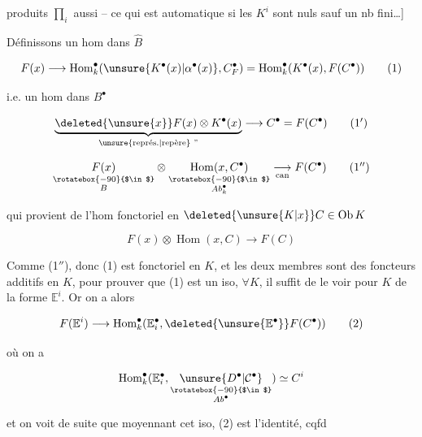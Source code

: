 
produits $\prod_{i}$ aussi -- ce qui est  automatique si les $K^i$ sont nuls sauf un nb fini…]


Définissons un hom dans $\widehat B$

\[
 F(x)\longrightarrow\operatorname{Hom}^{\bullet}_{k}(\unsure{K^{\bullet}(x)|\alpha^{\bullet}(x)},C^{\bullet}_{F})=\operatorname{Hom}^{\bullet}_{k}(K^{\bullet}(x),F(C^{\bullet})) \tag*{(1)}
\]

i.e. un hom dans $B^{\bullet}$

\[
 \underbrace{\deleted{\unsure{x}}F(x)\otimes K^{\bullet}(x)}_{\text{\unsure{représ.|repère}\ \textquotedblright}}\longrightarrow C^{\bullet}=F(C^{\bullet}) \tag*{(1$'$)}
\]


\[
 \underset{\substack{\rotatebox{-90}{$\in$}\\ B}}{F(x)}\otimes
 \underset{\substack{\rotatebox{-90}{$\in$}\\ Ab_k^{\bullet}}}{\operatorname{Hom}(x,C^{\bullet})}
 \underset{\mathrm{can}}{\longrightarrow}F(C^{\bullet}) \tag*{(1$''$)}
\]

qui provient de l'hom fonctoriel en $\deleted{\unsure{K|x}}C\in\operatorname{Ob}K$

\[
 F(x)\otimes\operatorname{Hom}(x,C)\longrightarrow F(C)
\]

Comme (1$''$), donc (1) est fonctoriel en $K$, et les deux membres sont des foncteurs additifs en $K$, pour prouver que  (1) est un iso, $\forall K$, il suffit de le voir pour $K$ de la forme  $\mathbb E^i$. Or on a alors

\[
 F(\mathbb E^i)\longrightarrow\operatorname{Hom}^{\bullet}_{k}(\mathbb E_i^{\bullet},\deleted{\unsure{\mathbb E^{\bullet}}}F(C^{\bullet})) \tag*{(2)}
\]

où on a 

\[
 \operatorname{Hom}^{\bullet}_{k}(\mathbb E_i^{\bullet},\underset{\substack{\rotatebox{-90}{$\in$}\\Ab^{\bullet}}}{\unsure{D^{\bullet}|\mathcal C^{\bullet}}})\simeq C^i
\]

et on voit de suite que moyennant cet iso, (2) est l'identité, cqfd

